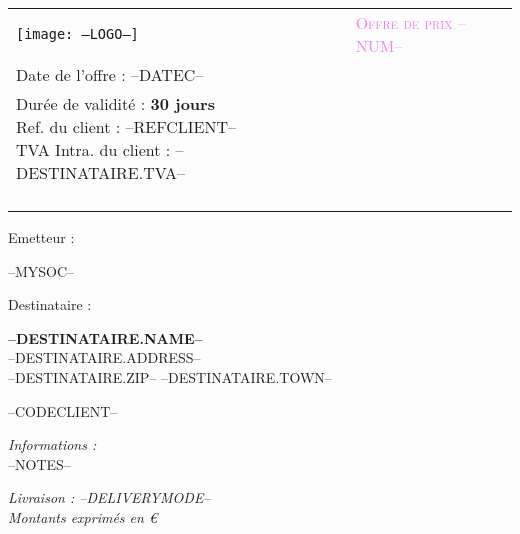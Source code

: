 \newcommand{\FOOT}{--FOOT--}

\newcommand{\specialcell}[2][c]{
	\parbox[#1]{6.3cm}{#2}}
	
\begin{tabular}{p{9cm} p{8cm}}
    \vspace{0pt} 
    \texttt{[image: --LOGO--]}
    & 
    \vspace{0pt}
   \raggedleft
	\textcolor{violet}{\textsc{\Large Offre de prix --NUM--}}\\
	Date de l'offre : --DATEC--\\
	{\small Dur\'ee de validité : \textbf{30 jours}\\
	Ref. du client : --REFCLIENT--\\
	TVA Intra. du  client : --DESTINATAIRE.TVA--\\}~\\
\end{tabular}

\vspace{-0.7cm}

\begin{minipage}[t]{0.40\textwidth}
{\small Emetteur :}\\
\begin{fminipage}
--MYSOC--
\end{fminipage}
\end{minipage}
\hspace{1cm}
\begin{minipage}[t]{0.52\textwidth}
{\small Destinataire :}

\begin{fminipage}
\textbf{\large --DESTINATAIRE.NAME--}\\
--DESTINATAIRE.ADDRESS--\\
\textsc{--DESTINATAIRE.ZIP-- --DESTINATAIRE.TOWN--}\\
\begin{minipage}{\textwidth}
\flushright
{\tiny --CODECLIENT--}
\end{minipage}
\end{fminipage}
\end{minipage}

\begin{minipage}[t]{0.60\textwidth}
{\small \it Informations :}\\
--NOTES-- \\
\end{minipage}
\hspace{1cm}
\begin{minipage}[t]{0.32\textwidth}
\begin{flushright}
{\it Livraison : {--DELIVERYMODE--}}\\
\vspace{1em}
{\footnotesize \textit{Montants exprimés en €}}
\end{flushright}
\end{minipage}

